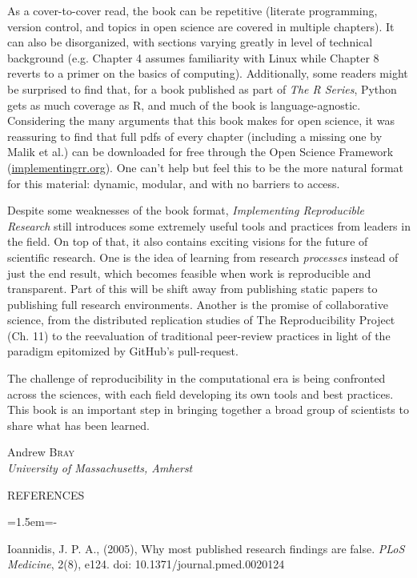 \documentclass[12pt]{article}
\newenvironment{references}{
  \begin{center} \textsf{REFERENCES} \end{center}
  \begin{list}{}{\topsep=0pt\parsep=0pt\baselineskip=20pt
   \leftmargin=1.5em\itemindent=-\leftmargin}}
  {\end{list}}
\begin{document}
As a cover-to-cover read, the book can be repetitive (literate programming, version
control, and topics in open science are covered in multiple chapters).  It can also be
disorganized, with sections varying greatly in level of technical background
(e.g. Chapter 4 assumes familiarity with Linux while Chapter 8 reverts to a primer on
the basics of computing). Additionally, some readers might be 
surprised to find that, for a book published as part of \emph{The R Series}, 
Python gets as much coverage as R, and much of the book is language-agnostic.
Considering the many arguments that this book makes for open science, it was
reassuring to find that full pdfs of every chapter (including a missing one by 
Malik et al.) can be downloaded for free through the Open Science Framework 
(\url{implementingrr.org}). One can't help but feel this to be the more natural format
 for this material: dynamic, modular, and with no barriers to access.

Despite some weaknesses of the book format, \emph{Implementing Reproducible
Research} still introduces some extremely useful tools and practices from leaders in 
the field.  On top of that, it also contains exciting visions for the future of scientific research.
One is the idea of learning from research \emph{processes} instead of just the 
end result, which becomes feasible when work is reproducible and transparent.
Part of this will be shift away from publishing static papers to publishing full research
environments.  Another is the promise of collaborative science, from the distributed
replication studies of The Reproducibility Project (Ch. 11) to the reevaluation of traditional 
peer-review practices in light of the paradigm epitomized by GitHub's pull-request.

The challenge of reproducibility in the computational era is being confronted 
across the sciences, with each field developing its own tools and best practices.
This book is an important step in bringing together a broad group of scientists
to share what has been learned.



\begin{flushright}\def\baselinestretch{1}
Andrew \textsc{Bray}\\
\emph{University of Massachusetts, Amherst}

\end{flushright}


\begin{references}

\item Ioannidis, J. P. A., (2005), Why most published research findings are false.
	\emph{PLoS Medicine}, 2(8), e124. doi: 10.1371/journal.pmed.0020124

\end{references}
\end{document}

